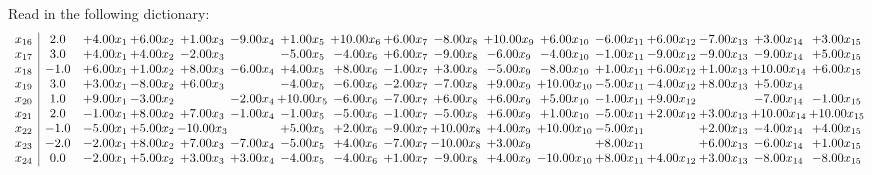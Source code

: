 \documentclass[9pt]{article}
\begin{document}
Read in the following dictionary:
\[\begin{array}{c| c c@{\hskip 2pt} c@{\hskip 2pt} c@{\hskip 2pt} c@{\hskip 2pt} c@{\hskip 2pt} c@{\hskip 2pt} c@{\hskip 2pt} c@{\hskip 2pt} c@{\hskip 2pt} c@{\hskip 2pt} c@{\hskip 2pt} c@{\hskip 2pt} c@{\hskip 2pt} c@{\hskip 2pt} c@{\hskip 2pt} }
 x_{16}   &  2.0 & +  4.00 x_{1} & +  6.00 x_{2} & +  1.00 x_{3} & -9.00 x_{4} & +  1.00 x_{5} & + 10.00 x_{6} & +  6.00 x_{7} & -8.00 x_{8} & + 10.00 x_{9} & +  6.00 x_{10} & -6.00 x_{11} & +  6.00 x_{12} & -7.00 x_{13} & +  3.00 x_{14} & +  3.00 x_{15}\\
 x_{17}   &  3.0 & +  4.00 x_{1} & +  4.00 x_{2} & -2.00 x_{3} &   & -5.00 x_{5} & -4.00 x_{6} & +  6.00 x_{7} & -9.00 x_{8} & -6.00 x_{9} & -4.00 x_{10} & -1.00 x_{11} & -9.00 x_{12} & -9.00 x_{13} & -9.00 x_{14} & +  5.00 x_{15}\\
 x_{18}   &  -1.0 & +  6.00 x_{1} & +  1.00 x_{2} & +  8.00 x_{3} & -6.00 x_{4} & +  4.00 x_{5} & +  8.00 x_{6} & -1.00 x_{7} & +  3.00 x_{8} & -5.00 x_{9} & -8.00 x_{10} & +  1.00 x_{11} & +  6.00 x_{12} & +  1.00 x_{13} & + 10.00 x_{14} & +  6.00 x_{15}\\
 x_{19}   &  3.0 & +  3.00 x_{1} & -8.00 x_{2} & +  6.00 x_{3} &   & -4.00 x_{5} & -6.00 x_{6} & -2.00 x_{7} & -7.00 x_{8} & +  9.00 x_{9} & + 10.00 x_{10} & -5.00 x_{11} & -4.00 x_{12} & +  8.00 x_{13} & +  5.00 x_{14} &   \\
 x_{20}   &  1.0 & +  9.00 x_{1} & -3.00 x_{2} &   & -2.00 x_{4} & + 10.00 x_{5} & -6.00 x_{6} & -7.00 x_{7} & +  6.00 x_{8} & +  6.00 x_{9} & +  5.00 x_{10} & -1.00 x_{11} & +  9.00 x_{12} &   & -7.00 x_{14} & -1.00 x_{15}\\
 x_{21}   &  2.0 & -1.00 x_{1} & +  8.00 x_{2} & +  7.00 x_{3} & -1.00 x_{4} & -1.00 x_{5} & -5.00 x_{6} & -1.00 x_{7} & -5.00 x_{8} & +  6.00 x_{9} & +  1.00 x_{10} & -5.00 x_{11} & +  2.00 x_{12} & +  3.00 x_{13} & + 10.00 x_{14} & + 10.00 x_{15}\\
 x_{22}   &  -1.0 & -5.00 x_{1} & +  5.00 x_{2} & -10.00 x_{3} &   & +  5.00 x_{5} & +  2.00 x_{6} & -9.00 x_{7} & + 10.00 x_{8} & +  4.00 x_{9} & + 10.00 x_{10} & -5.00 x_{11} &   & +  2.00 x_{13} & -4.00 x_{14} & +  4.00 x_{15}\\
 x_{23}   &  -2.0 & -2.00 x_{1} & +  8.00 x_{2} & +  7.00 x_{3} & -7.00 x_{4} & -5.00 x_{5} & +  4.00 x_{6} & -7.00 x_{7} & -10.00 x_{8} & +  3.00 x_{9} &   & +  8.00 x_{11} &   & +  6.00 x_{13} & -6.00 x_{14} & +  1.00 x_{15}\\
 x_{24}   &  0.0 & -2.00 x_{1} & +  5.00 x_{2} & +  3.00 x_{3} & +  3.00 x_{4} & -4.00 x_{5} & -4.00 x_{6} & +  1.00 x_{7} & -9.00 x_{8} & +  4.00 x_{9} & -10.00 x_{10} & +  8.00 x_{11} & +  4.00 x_{12} & +  3.00 x_{13} & -8.00 x_{14} & -8.00 x_{15}\\

\end{array}\]
\end{document}
